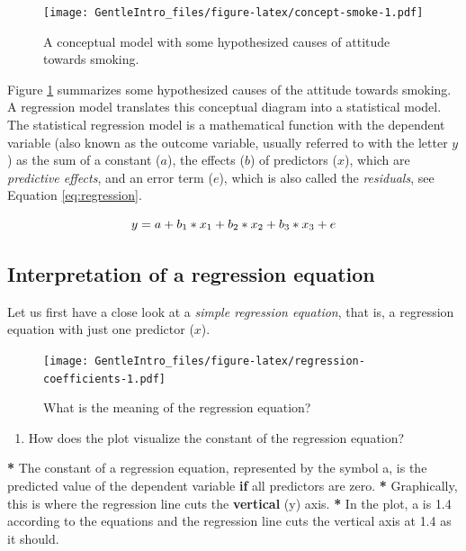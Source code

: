 \documentclass[a4paper]{book}
\newenvironment{Shaded}{\begin{snugshade}}{\end{snugshade}}
\newcommand{\KeywordTok}[1]{\textcolor[rgb]{0,0,0}{\textbf{#1}}}
\newcommand{\FloatTok}[1]{\textcolor[rgb]{0.00,0.00,0.00}{#1}}
\newcommand{\StringTok}[1]{\textcolor[rgb]{0.00,0.00,0.00}{#1}}
\newcommand{\ControlFlowTok}[1]{\textcolor[rgb]{0.00,0.00,0.00}{\textbf{#1}}}
\newcommand{\OperatorTok}[1]{\textcolor[rgb]{0.00,0.00,0.00}{\textbf{#1}}}
\newcommand{\NormalTok}[1]{#1}
\providecommand{\tightlist}{%
  \setlength{\itemsep}{0pt}\setlength{\parskip}{0pt}}
\theoremstyle{definition}
\theoremstyle{definition}
\theoremstyle{definition}
\theoremstyle{remark}
\begin{document}
\begin{figure}
\centering
\texttt{[image: GentleIntro\_files/figure-latex/concept-smoke-1.pdf]}
\caption{\label{fig:concept-smoke}A conceptual model with some hypothesized
causes of attitude towards smoking.}
\end{figure}

Figure \ref{fig:concept-smoke} summarizes some hypothesized causes of
the attitude towards smoking. A regression model translates this
conceptual diagram into a statistical model. The statistical regression
model is a mathematical function with the dependent variable (also known
as the outcome variable, usually referred to with the letter \(y\)) as
the sum of a constant (\(a\)), the effects (\(b\)) of predictors
(\(x\)), which are \emph{predictive effects}, and an error term (\(e\)),
which is also called the \emph{residuals}, see Equation
\eqref{eq:regression}.

\begin{equation} 
\small
  y = a + b_1*x_1 + b_2*x_2 + b_3*x_3 + e 
  \label{eq:regression} 
\normalsize
\end{equation}

\subsection{Interpretation of a regression
equation}\label{interpretation-of-a-regression-equation}

Let us first have a close look at a \emph{simple regression equation},
that is, a regression equation with just one predictor (\(x\)).

\begin{figure}
\centering
\texttt{[image: GentleIntro\_files/figure-latex/regression-coefficients-1.pdf]}
\caption{\label{fig:regression-coefficients}What is the meaning of the
regression equation?}
\end{figure}

\begin{enumerate}
\def\labelenumi{\arabic{enumi}.}
\tightlist
\item
  How does the plot visualize the constant of the regression equation?
\end{enumerate}

\begin{Shaded}
\begin{Highlighting}[]
\OperatorTok{*}\StringTok{ }\NormalTok{The constant of a regression equation, represented by the symbol a, is the}
\NormalTok{predicted value of the dependent variable }\ControlFlowTok{if}\NormalTok{ all predictors are zero.}
\OperatorTok{*}\StringTok{ }\NormalTok{Graphically, this is where the regression line cuts the }\KeywordTok{vertical}\NormalTok{ (y) axis.}
\OperatorTok{*}\StringTok{ }\NormalTok{In the plot, a is }\FloatTok{1.4}\NormalTok{ according to the equations and the regression line cuts}
\NormalTok{the vertical axis at }\FloatTok{1.4}\NormalTok{ as it should.}
\end{Highlighting}
\end{Shaded}
\end{document}
